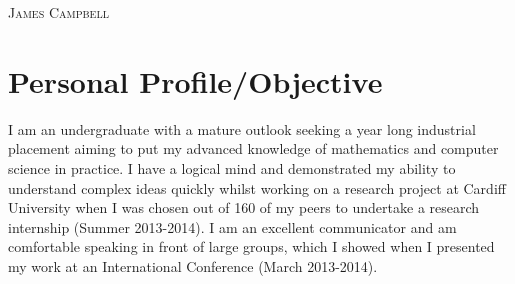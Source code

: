 \documentclass[a4paper]{article}
\begin{document}
\pagestyle{empty} %
\begin{multicols}{2}

\raggedright{\textsc{\Huge{James Campbell}}}\\
\columnbreak
{}

\end{multicols}
\section{Personal Profile/Objective}
I am an undergraduate with a mature outlook seeking a year long industrial placement aiming to put my advanced knowledge of mathematics and computer science in practice.
I have a logical mind and demonstrated my ability to understand complex ideas quickly whilst working on a research project at Cardiff University when I was chosen out of 160 of my peers to undertake a research internship (Summer 2013-2014).
I am an excellent communicator and am comfortable speaking in front of large groups, which I showed when I presented my work at an International Conference (March 2013-2014).

\end{document}
